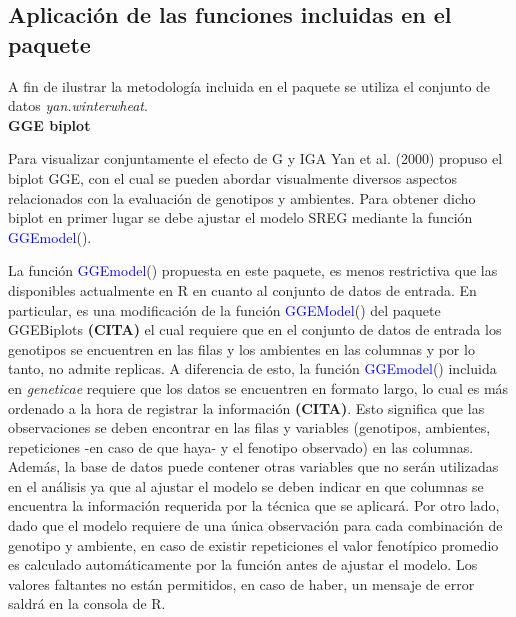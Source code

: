 \subsection{Aplicación de las funciones incluidas en el paquete}

A fin de ilustrar la metodología incluida en el paquete se utiliza el conjunto de datos \emph{yan.winterwheat}.\\

\textbf{GGE biplot}

Para visualizar conjuntamente el efecto de G y IGA Yan et al. (2000) propuso el biplot GGE, con el cual se pueden abordar visualmente diversos aspectos relacionados con la evaluación de genotipos y ambientes. Para obtener dicho biplot en primer lugar se debe ajustar el modelo SREG mediante la función \textcolor{blue}{GGEmodel}(). 

La función \textcolor{blue}{GGEmodel}() propuesta en este paquete, es menos restrictiva que las disponibles actualmente en R en cuanto al conjunto de datos de entrada. En particular, es una modificación de la función \textcolor{blue}{GGEModel}() del paquete GGEBiplots \textbf{(CITA)} el cual requiere que en el conjunto de datos de entrada los genotipos se encuentren en las filas y los ambientes en las columnas y por lo tanto, no admite replicas. A diferencia de esto, la función \textcolor{blue}{GGEmodel}() incluida en \emph{geneticae} requiere que los datos se encuentren en formato largo, lo cual es más ordenado a la hora de registrar la información \textbf{(CITA)}. Esto significa que las observaciones se deben encontrar en las filas y variables (genotipos, ambientes, repeticiones -en caso de que haya- y el fenotipo observado) en las columnas. Además, la base de datos puede contener otras variables que no serán utilizadas en el análisis ya que al ajustar el modelo se deben indicar en que columnas se encuentra la información requerida por la técnica que se aplicará. Por otro lado, dado que el modelo requiere de una única observación para cada combinación de genotipo y ambiente, en caso de existir repeticiones el valor fenotípico promedio es calculado automáticamente por la función antes de ajustar el modelo. Los valores faltantes no están permitidos, en caso de haber, un mensaje de error saldrá en la consola de R.\\  

